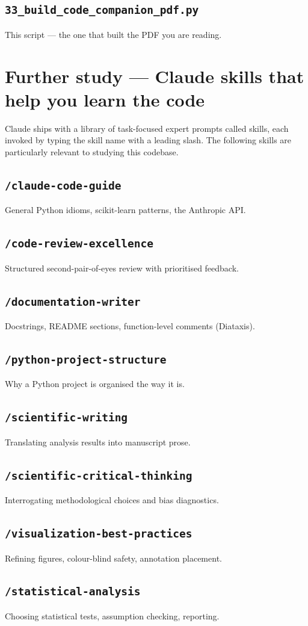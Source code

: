 \documentclass[11pt,a4paper]{article}
\begin{document}
\subsection{\texttt{33\_build\_code\_companion\_pdf.py}}
This script --- the one that built the PDF you are reading.
\clearpage
\section{Further study — Claude skills that help you learn the code}
Claude ships with a library of task-focused expert prompts called skills, each invoked by typing the skill name with a leading slash. The following skills are particularly relevant to studying this codebase.
\subsection*{\texttt{/claude-code-guide}}
General Python idioms, scikit-learn patterns, the Anthropic API.
\subsection*{\texttt{/code-review-excellence}}
Structured second-pair-of-eyes review with prioritised feedback.
\subsection*{\texttt{/documentation-writer}}
Docstrings, README sections, function-level comments (Diataxis).
\subsection*{\texttt{/python-project-structure}}
Why a Python project is organised the way it is.
\subsection*{\texttt{/scientific-writing}}
Translating analysis results into manuscript prose.
\subsection*{\texttt{/scientific-critical-thinking}}
Interrogating methodological choices and bias diagnostics.
\subsection*{\texttt{/visualization-best-practices}}
Refining figures, colour-blind safety, annotation placement.
\subsection*{\texttt{/statistical-analysis}}
Choosing statistical tests, assumption checking, reporting.
\end{document}
